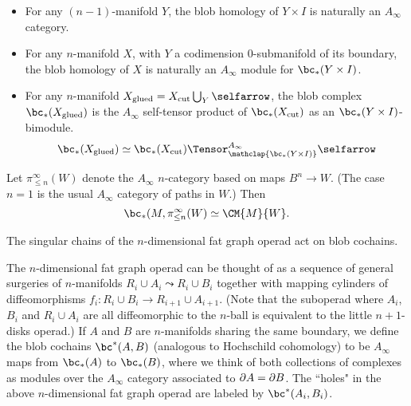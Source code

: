 \begin{property}
\label{property:gluing}%
\mbox{}%
\begin{itemize}
\item For any $(n-1)$-manifold $Y$, the blob homology of $Y \times I$ is
naturally an $A_\infty$ category. %

\item For any $n$-manifold $X$, with $Y$ a codimension $0$-submanifold of its boundary, the blob homology of $X$ is naturally an
$A_\infty$ module for $\bc_*(Y \times I)$.

\item For any $n$-manifold $X_\text{glued} = X_\text{cut} \bigcup_Y \selfarrow$, the blob complex $\bc_*(X_\text{glued})$ is the $A_\infty$ self-tensor product of
$\bc_*(X_\text{cut})$ as an $\bc_*(Y \times I)$-bimodule.
\begin{equation*}
\bc_*(X_\text{glued}) \simeq \bc_*(X_\text{cut}) \Tensor^{A_\infty}_{\mathclap{\bc_*(Y \times I)}} \selfarrow
\end{equation*}
\end{itemize}
\end{property}



\begin{property}
Let $\pi^\infty_{\le n}(W)$ denote the $A_\infty$ $n$-category based on maps 
$B^n \to W$.
(The case $n=1$ is the usual $A_\infty$ category of paths in $W$.)
Then 
$$\bc_*(M, \pi^\infty_{\le n}(W) \simeq \CM{M}{W}.$$
\end{property}

\begin{property}
The singular chains of the $n$-dimensional fat graph operad act on blob cochains.
\end{property}
\begin{rem}
The $n$-dimensional fat graph operad can be thought of as a sequence of general surgeries
of $n$-manifolds
$R_i \cup A_i \leadsto R_i \cup B_i$ together with mapping cylinders of diffeomorphisms
$f_i: R_i\cup B_i \to R_{i+1}\cup A_{i+1}$.
(Note that the suboperad where $A_i$, $B_i$ and $R_i\cup A_i$ are all diffeomorphic to 
the $n$-ball is equivalent to the little $n{+}1$-disks operad.)
If $A$ and $B$ are $n$-manifolds sharing the same boundary, we define
the blob cochains $\bc^*(A, B)$ (analogous to Hochschild cohomology) to be
$A_\infty$ maps from $\bc_*(A)$ to $\bc_*(B)$, where we think of both
collections of complexes as modules over the $A_\infty$ category associated to $\partial A = \partial B$.
The ``holes" in the above 
$n$-dimensional fat graph operad are labeled by $\bc^*(A_i, B_i)$.
\end{rem}







